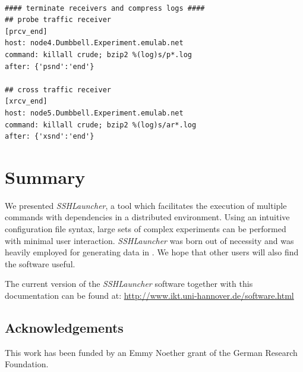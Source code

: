 \begin{Verbatim}[fontsize=\footnotesize]

#### terminate receivers and compress logs ####
## probe traffic receiver
[prcv_end]
host: node4.Dumbbell.Experiment.emulab.net
command: killall crude; bzip2 %(log)s/p*.log
after: {'psnd':'end'}

## cross traffic receiver
[xrcv_end]
host: node5.Dumbbell.Experiment.emulab.net
command: killall crude; bzip2 %(log)s/ar*.log
after: {'xsnd':'end'}
\end{Verbatim}


\chapter{Summary}

We presented \emph{SSHLauncher}, a tool which facilitates the
execution of multiple commands with dependencies in a distributed
environment. Using an intuitive configuration file syntax, large sets
of complex experiments can be performed with minimal user
interaction. \emph{SSHLauncher} was born out of necessity and was
heavily employed for generating data in \cite{BF08}. We hope that
other users will also find the software useful. 

The current version of the \emph{SSHLauncher} software together
with this documentation can be found at:
\url{http://www.ikt.uni-hannover.de/software.html}


\section*{Acknowledgements}
This work has been funded by an Emmy Noether grant of the German
Research Foundation.





